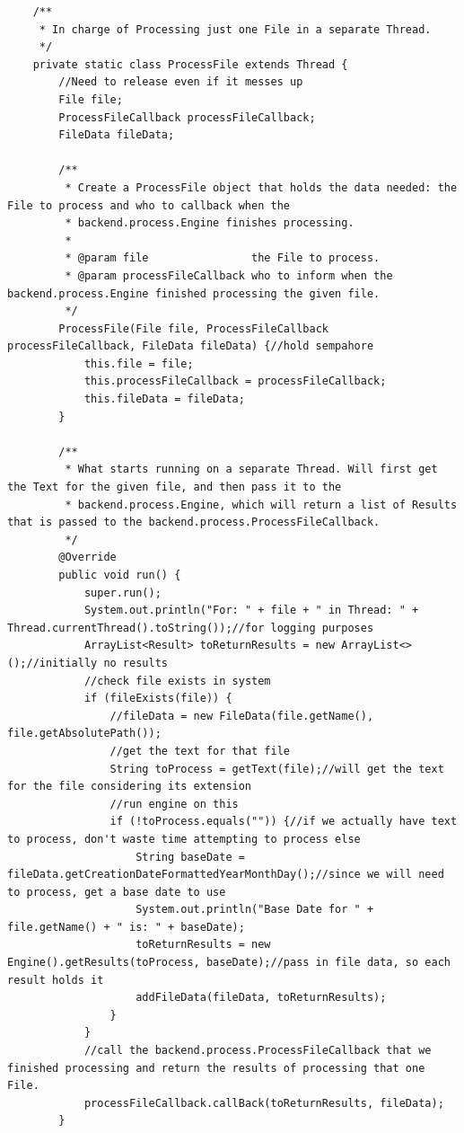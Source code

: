 \begin{lstlisting}
    /**
     * In charge of Processing just one File in a separate Thread.
     */
    private static class ProcessFile extends Thread {
        //Need to release even if it messes up
        File file;
        ProcessFileCallback processFileCallback;
        FileData fileData;

        /**
         * Create a ProcessFile object that holds the data needed: the File to process and who to callback when the
         * backend.process.Engine finishes processing.
         *
         * @param file                the File to process.
         * @param processFileCallback who to inform when the backend.process.Engine finished processing the given file.
         */
        ProcessFile(File file, ProcessFileCallback processFileCallback, FileData fileData) {//hold sempahore
            this.file = file;
            this.processFileCallback = processFileCallback;
            this.fileData = fileData;
        }

        /**
         * What starts running on a separate Thread. Will first get the Text for the given file, and then pass it to the
         * backend.process.Engine, which will return a list of Results that is passed to the backend.process.ProcessFileCallback.
         */
        @Override
        public void run() {
            super.run();
            System.out.println("For: " + file + " in Thread: " + Thread.currentThread().toString());//for logging purposes
            ArrayList<Result> toReturnResults = new ArrayList<>();//initially no results
            //check file exists in system
            if (fileExists(file)) {
                //fileData = new FileData(file.getName(), file.getAbsolutePath());
                //get the text for that file
                String toProcess = getText(file);//will get the text for the file considering its extension
                //run engine on this
                if (!toProcess.equals("")) {//if we actually have text to process, don't waste time attempting to process else
                    String baseDate = fileData.getCreationDateFormattedYearMonthDay();//since we will need to process, get a base date to use
                    System.out.println("Base Date for " + file.getName() + " is: " + baseDate);
                    toReturnResults = new Engine().getResults(toProcess, baseDate);//pass in file data, so each result holds it
                    addFileData(fileData, toReturnResults);
                }
            }
            //call the backend.process.ProcessFileCallback that we finished processing and return the results of processing that one File.
            processFileCallback.callBack(toReturnResults, fileData);
        }


\end{lstlisting}
